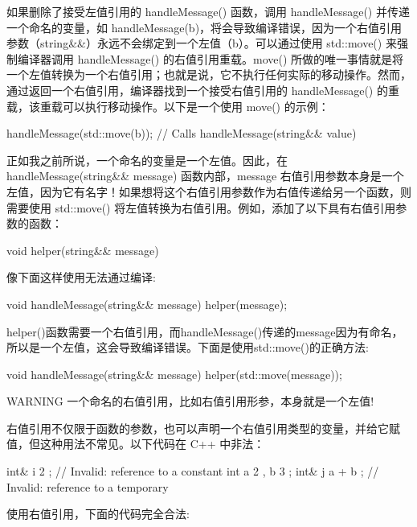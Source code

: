 如果删除了接受左值引用的 handleMessage() 函数，调用 handleMessage() 并传递一个命名的变量，如 handleMessage(b)，将会导致编译错误，因为一个右值引用参数（string\&\&）永远不会绑定到一个左值（b）。可以通过使用 std::move() 来强制编译器调用 handleMessage() 的右值引用重载。move() 所做的唯一事情就是将一个左值转换为一个右值引用；也就是说，它不执行任何实际的移动操作。然而，通过返回一个右值引用，编译器找到一个接受右值引用的 handleMessage() 的重载，该重载可以执行移动操作。以下是一个使用 move() 的示例：

\begin{cpp}
handleMessage(std::move(b)); // Calls handleMessage(string&& value)
\end{cpp}

正如我之前所说，一个命名的变量是一个左值。因此，在 handleMessage(string\&\& message) 函数内部，message 右值引用参数本身是一个左值，因为它有名字！如果想将这个右值引用参数作为右值传递给另一个函数，则需要使用 std::move() 将左值转换为右值引用。例如，添加了以下具有右值引用参数的函数：

\begin{cpp}
void helper(string&& message) { }
\end{cpp}

像下面这样使用无法通过编译:

\begin{cpp}
void handleMessage(string&& message) { helper(message); }
\end{cpp}

helper()函数需要一个右值引用，而handleMessage()传递的message因为有命名，所以是一个左值，这会导致编译错误。下面是使用std::move()的正确方法:

\begin{cpp}
void handleMessage(string&& message) { helper(std::move(message)); }
\end{cpp}

\begin{myWarning}{WARNING}
一个命名的右值引用，比如右值引用形参，本身就是一个左值!
\end{myWarning}

右值引用不仅限于函数的参数，也可以声明一个右值引用类型的变量，并给它赋值，但这种用法不常见。以下代码在 C++ 中非法：

\begin{cpp}
int& i { 2 }; // Invalid: reference to a constant
int a { 2 }, b { 3 };
int& j { a + b }; // Invalid: reference to a temporary
\end{cpp}

使用右值引用，下面的代码完全合法:

